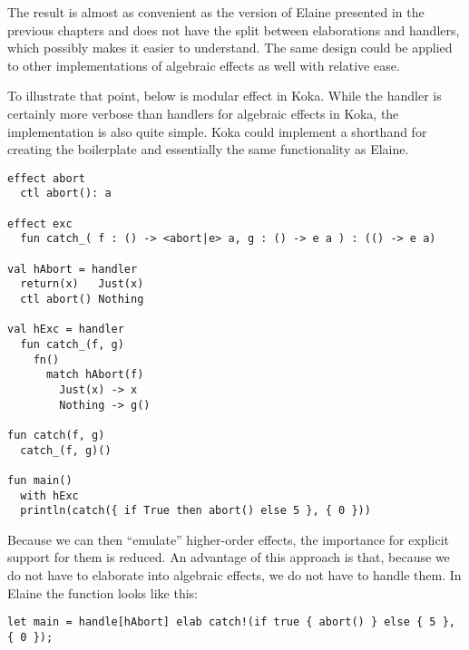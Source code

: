 The result is almost as convenient as the version of Elaine presented in the previous chapters and does not have the split between elaborations and handlers, which possibly makes it easier to understand. The same design could be applied to other implementations of algebraic effects as well with relative ease.

To illustrate that point, below is modular  effect in Koka. While the handler is certainly more verbose than handlers for algebraic effects in Koka, the implementation is also quite simple. Koka could implement a shorthand for creating the boilerplate and essentially the same functionality as Elaine.

\begin{lstlisting}[language={},style=fancy]
effect abort
  ctl abort(): a
  
effect exc
  fun catch_( f : () -> <abort|e> a, g : () -> e a ) : (() -> e a)
  
val hAbort = handler
  return(x)   Just(x)
  ctl abort() Nothing

val hExc = handler
  fun catch_(f, g)
    fn()
      match hAbort(f)
        Just(x) -> x
        Nothing -> g()

fun catch(f, g)
  catch_(f, g)()

fun main()
  with hExc
  println(catch({ if True then abort() else 5 }, { 0 }))
\end{lstlisting}

Because we can then ``emulate'' higher-order effects, the importance for explicit support for them is reduced. An advantage of this approach is that, because we do not have to elaborate into algebraic effects, we do not have to handle them. In Elaine the  function looks like this:

\begin{lstlisting}[language=elaine,style=fancy]
let main = handle[hAbort] elab catch!(if true { abort() } else { 5 }, { 0 });
\end{lstlisting}

